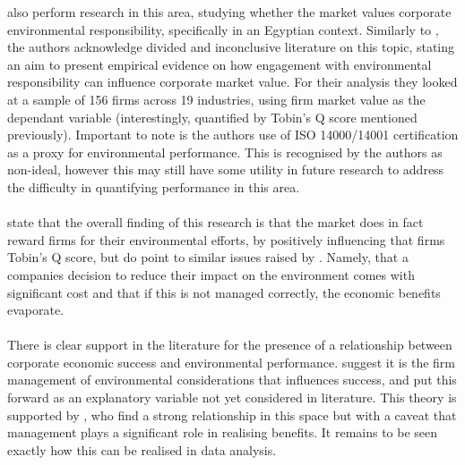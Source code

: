 {\cite{wahba2008does} also perform research in this area, studying whether the market values corporate environmental responsibility, specifically in an Egyptian context. Similarly to \cite{schaltegger2002link}, the authors acknowledge divided and inconclusive literature on this topic, stating an aim to present empirical evidence on how engagement with environmental responsibility can influence corporate market value. For their analysis they looked at a sample of 156 firms across 19 industries, using firm market value as the dependant variable (interestingly, quantified by Tobin's Q score mentioned previously). Important to note is the authors use of ISO 14000/14001 certification as a proxy for environmental performance. This is recognised by the authors as non-ideal, however this may still have some utility in future research to address the difficulty in quantifying performance in this area. \\\\ \cite{wahba2008does} state that the overall finding of this research is that the market does in fact reward firms for their environmental efforts, by positively influencing that firms Tobin's Q score, but do point to similar issues raised by \cite{schaltegger2002link}. Namely, that a companies decision to reduce their impact on the environment comes with significant cost and that if this is not managed correctly, the economic benefits evaporate.     \\\\
There is clear support in the literature for the presence of a relationship between corporate economic success and environmental performance. \cite{schaltegger2002link} suggest it is the firm management of environmental considerations that influences success, and put this forward as an explanatory variable not yet considered in literature. This theory is supported by \cite{wahba2008does}, who find a strong relationship in this space but with a caveat that management plays a significant role in realising benefits. It remains to be seen exactly how this can be realised in data analysis. }
